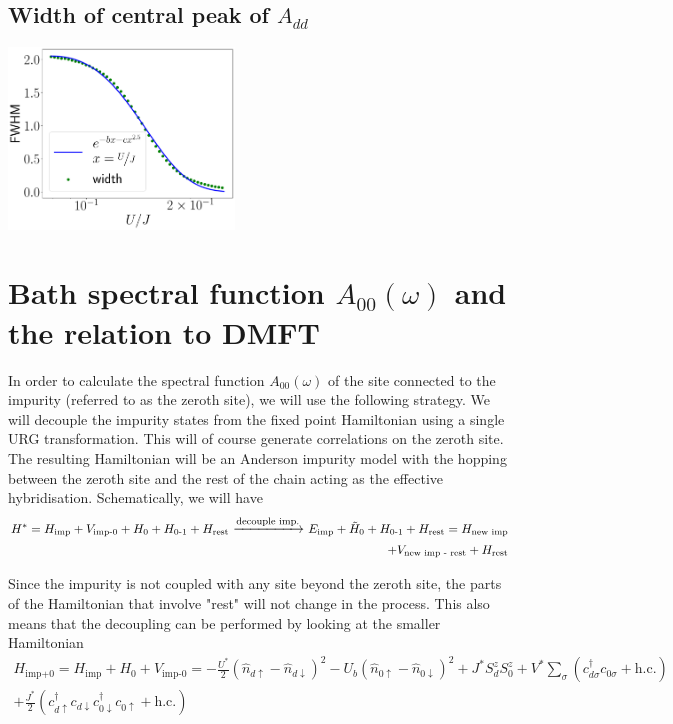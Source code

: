 \subsection{Width of central peak of \(A_{dd}\)}

\begin{center}
\includegraphics[width=0.45\textwidth]{../figures/spec_func_width_fit.pdf}
\end{center}

\section{Bath spectral function \(A_{00}(\omega)\) and the relation to DMFT}
In order to calculate the spectral function \(A_{00}(\omega)\) of the site connected to the impurity (referred to as the zeroth site), we will use the following strategy. We will decouple the impurity states from the fixed point Hamiltonian using a single URG transformation. This will of course generate correlations on the zeroth site. The resulting Hamiltonian will be an Anderson impurity model with the hopping between the zeroth site and the rest of the chain acting as the effective hybridisation. Schematically, we will have
\begin{equation}\begin{aligned}
	H^* = H_\text{imp} + V_\text{imp-0} + H_\text{0} + H_\text{0-1} + H_\text{rest} ~ \mathlarger{\xrightarrow{\text{decouple imp.}}} ~ E_\text{imp} + \tilde H_\text{0} + H_\text{0-1} + H_\text{rest} = H_\text{new imp} \\
	+ V_\text{new imp - rest} + H_\text{rest}
\end{aligned}\end{equation}

Since the impurity is not coupled with any site beyond the zeroth site, the parts of the Hamiltonian that involve "rest" will not change in the process. This also means that the decoupling can be performed by looking at the smaller Hamiltonian
\begin{equation}\begin{aligned}
	H_\text{imp+0} = H_\text{imp} + H_\text{0} + V_\text{imp-0} = -\frac{U^*}{2}\left( \hat n_{d \uparrow} - \hat n_{d \downarrow} \right)^2 - U_b \left( \hat n_{0 \uparrow} - \hat n_{0 \downarrow} \right)^2 + J^*S_d^z S_0^z + {V^*}\sum_\sigma \left(c^\dagger_{d\sigma}c_{0\sigma} + \text{h.c.}\right) \\
	+ \frac{J^*}{2}\left( c^\dagger_{d \uparrow}c_{d \downarrow} c^\dagger_{0 \downarrow} c_{0 \uparrow} + \text{h.c.} \right) 
\end{aligned}\end{equation}


